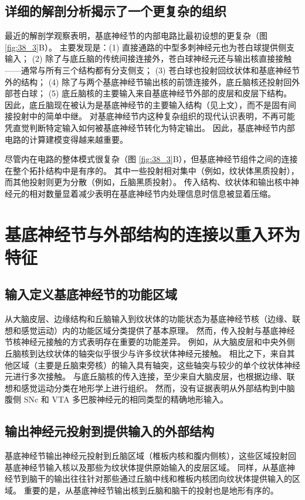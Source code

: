 \subsection{详细的解剖分析揭示了一个更复杂的组织}
最近的解剖学观察表明，基底神经节的内部电路比最初设想的更复杂（图 \ref{fig:38_3}B）。 主要发现是：(1) 直接通路的中型多刺神经元也为苍白球提供侧支输入； (2) 除了与底丘脑的传统间接连接外，苍白球神经元还与输出核直接接触——通常与所有三个结构都有分支侧支； (3) 苍白球也投射回纹状体和基底神经节外的结构； (4) 除了与两个基底神经节输出核的前馈连接外，底丘脑核还投射回外部苍白球； (5) 底丘脑核的主要输入来自基底神经节外部的皮层和皮层下结构。 因此，底丘脑现在被认为是基底神经节的主要输入结构（见上文），而不是固有间接投射中的简单中继。 对基底神经节内这种复杂组织的现代认识表明，不再可能凭直觉判断特定输入如何被基底神经节转化为特定输出。 因此，基底神经节内部电路的计算建模变得越来越重要。

尽管内在电路的整体模式很复杂（图 \ref{fig:38_3}B），但基底神经节组件之间的连接在整个拓扑结构中是有序的。 其中一些投射相对集中（例如，纹状体黑质投射），而其他投射则更为分散（例如，丘脑黑质投射）。 传入结构、纹状体和输出核中神经元的相对数量显着减少表明在基底神经节内处理信息时信息被显着压缩。


\section{基底神经节与外部结构的连接以重入环为特征}
\subsection{输入定义基底神经节的功能区域}
从大脑皮层、边缘结构和丘脑输入到纹状体的功能状态为基底神经节核（边缘、联想和感觉运动）内的功能区域分类提供了基本原理。 然而，传入投射与基底神经节核神经元接触的方式表明存在重要的功能差异。 例如，从大脑皮层和中央外侧丘脑核到达纹状体的轴突似乎很少与许多纹状体神经元接触。 相比之下，来自其他区域（主要是丘脑束旁核）的输入具有轴突，这些轴突与较少的单个纹状体神经元进行多次接触。 与底丘脑核的传入连接，至少来自大脑皮层，也根据边缘、联想和感觉运动分类在地形学上进行组织。 然而，没有证据表明从外部结构到中脑腹侧 SNc 和 VTA 多巴胺神经元的相同类型的精确地形输入。

\subsection{输出神经元投射到提供输入的外部结构}
基底神经节输出神经元投射到丘脑区域（椎板内核和腹内侧核），这些区域投射回基底神经节输入核以及那些为纹状体提供原始输入的皮层区域。 同样，从基底神经节到脑干的输出往往针对那些通过丘脑中线和椎板内核团向纹状体提供输入的区域。 重要的是，从基底神经节输出核到丘脑和脑干的投射也是地形有序的。

